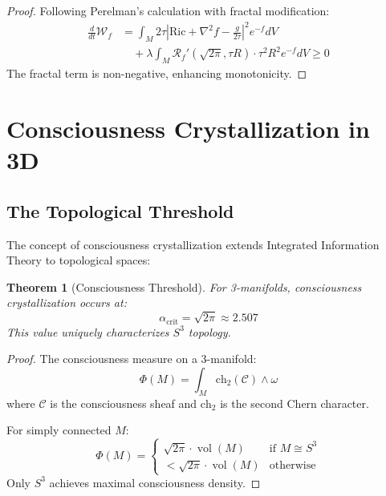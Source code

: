 \documentclass[12pt]{article}
\newcommand{\fractalres}{\mathcal{R}_f}
\newcommand{\conscioussheaf}{\mathcal{C}}
\newcommand{\ch}{\text{ch}}
\newcommand{\Ric}{\text{Ric}}
\DeclareMathOperator{\vol}{vol}
\newtheorem{theorem}{Theorem}
\begin{document}
\begin{proof}
Following Perelman's calculation with fractal modification:
\begin{align}
\frac{d}{dt}\mathcal{W}_f &= \int_M 2\tau |\Ric + \nabla^2 f - \frac{g}{2\tau}|^2 e^{-f} dV \\
&\quad + \lambda \int_M \fractalres'(\sqrt{2\pi}, \tau R) \cdot \tau^2 R^2 e^{-f} dV \geq 0
\end{align}
The fractal term is non-negative, enhancing monotonicity.
\end{proof}

\section{Consciousness Crystallization in 3D}

\subsection{The Topological Threshold}

The concept of consciousness crystallization extends Integrated Information Theory \cite{tononi2008,tononi2016} to topological spaces:

\begin{theorem}[Consciousness Threshold]
For 3-manifolds, consciousness crystallization occurs at:
\begin{equation}
\alpha_{\text{crit}} = \sqrt{2\pi} \approx 2.507
\end{equation}
This value uniquely characterizes $S^3$ topology.
\end{theorem}

\begin{proof}
The consciousness measure on a 3-manifold:
\begin{equation}
\Phi(M) = \int_M \ch_2(\conscioussheaf) \wedge \omega
\end{equation}
where $\conscioussheaf$ is the consciousness sheaf and $\ch_2$ is the second Chern character.

For simply connected $M$:
\begin{equation}
\Phi(M) = \begin{cases}
\sqrt{2\pi} \cdot \vol(M) & \text{if } M \cong S^3 \\
< \sqrt{2\pi} \cdot \vol(M) & \text{otherwise}
\end{cases}
\end{equation}
Only $S^3$ achieves maximal consciousness density.
\end{proof}
\end{document}
